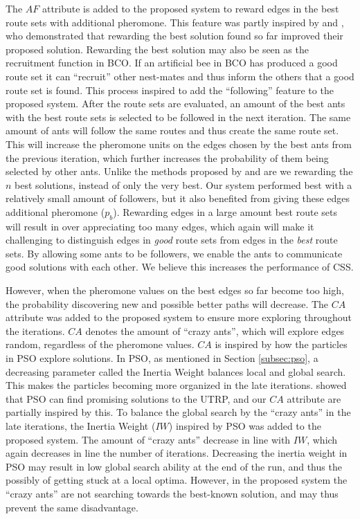 The $AF$ attribute is added to the proposed system to reward edges in the best route sets with additional pheromone. This feature was partly inspired by \citet{tripathi09} and \citet{sedighpour14}, who demonstrated that rewarding the best solution found so far improved their proposed solution. Rewarding the best solution may also be seen as the recruitment function in BCO. If an artificial bee in BCO has produced a good route set it can ``recruit'' other nest-mates and thus inform the others that a good route set is found. This process inspired to add the ``following'' feature to the proposed system. After the route sets are evaluated, an amount of the best ants with the best route sets is selected to be followed in the next iteration. The same amount of ants will follow the same routes and thus create the same route set. This will increase the pheromone units on the edges chosen by the best ants from the previous iteration, which further increases the probability of them being selected by other ants. Unlike the methods proposed by \citet{tripathi09} and \citet{sedighpour14} are we rewarding the $n$ best solutions, instead of only the very best. Our system performed best with a relatively small amount of followers, but it also benefited from giving these edges additional pheromone ($p_b$). Rewarding edges in a large amount best route sets will result in over appreciating too many edges, which again will make it challenging to distinguish edges in \textit{good} route sets from edges in the \textit{best} route sets. By allowing some ants to be followers, we enable the ants to communicate good solutions with each other. We believe this increases the performance of CSS. 

However, when the pheromone values on the best edges so far become too high, the probability discovering new and possible better paths will decrease. The $CA$ attribute was added to the proposed system to ensure more exploring throughout the iterations. $CA$ denotes the amount of ``crazy ants'', which will explore edges random, regardless of the pheromone values. $CA$ is inspired by how the particles in PSO explore solutions. In PSO, as mentioned in Section \vref{subsec:pso}, a decreasing parameter called the Inertia Weight balances local and global search. This makes the particles becoming more organized in the late iterations. \citet{kechagiopoulos14} showed that PSO can find promising solutions to the UTRP, and our $CA$ attribute are partially inspired by this. To balance the global search by the ``crazy ants'' in the late iterations, the Inertia Weight ($IW$) inspired by PSO was added to the proposed system. The amount of ``crazy ants'' decrease in line with $IW$, which again decreases in line the number of iterations. Decreasing the inertia weight in PSO may result in low global search ability at the end of the run, and thus the possibly of getting stuck at a local optima. However, in the proposed system the ``crazy ants'' are not searching towards the best-known solution, and may thus prevent the same disadvantage.

